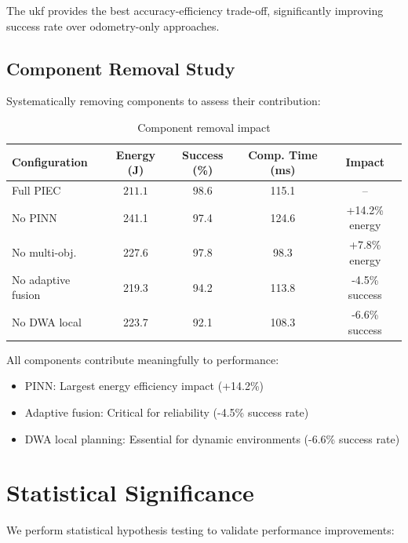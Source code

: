 The \acrshort{ukf} provides the best accuracy-efficiency trade-off, significantly improving success rate over odometry-only approaches.

\subsection{Component Removal Study}

Systematically removing components to assess their contribution:

\begin{table}[htbp]
\centering
\caption{Component removal impact}
\label{tab:ablation_components}
\begin{tabular}{lcccc}
\toprule
\textbf{Configuration} & \textbf{Energy (J)} & \textbf{Success (\%)} & \textbf{Comp. Time (ms)} & \textbf{Impact} \\
\midrule
Full PIEC & $\mathbf{211.1}$ & $\mathbf{98.6}$ & 115.1 & -- \\
No PINN & 241.1 & 97.4 & 124.6 & +14.2\% energy \\
No multi-obj. & 227.6 & 97.8 & 98.3 & +7.8\% energy \\
No adaptive fusion & 219.3 & 94.2 & 113.8 & -4.5\% success \\
No DWA local & 223.7 & 92.1 & 108.3 & -6.6\% success \\
\bottomrule
\end{tabular}
\end{table}

All components contribute meaningfully to performance:
\begin{itemize}
    \item PINN: Largest energy efficiency impact (+14.2\%)
    \item Adaptive fusion: Critical for reliability (-4.5\% success rate)
    \item DWA local planning: Essential for dynamic environments (-6.6\% success rate)
\end{itemize}


\section{Statistical Significance}

We perform statistical hypothesis testing to validate performance improvements:

